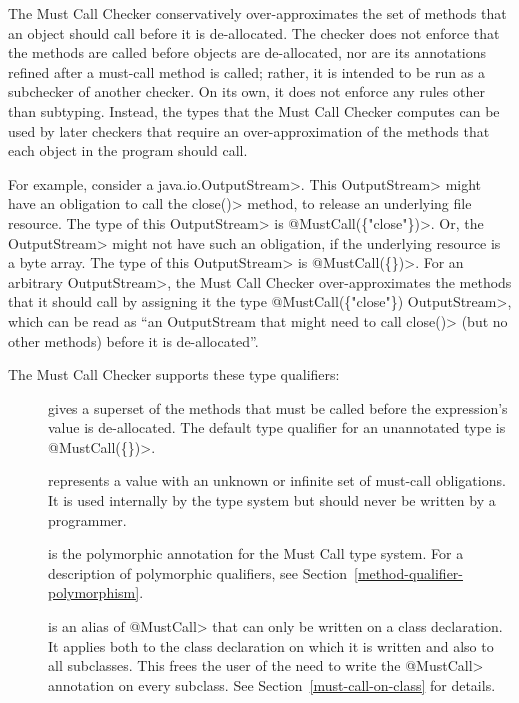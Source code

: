 \htmlhr
{}

The Must Call Checker conservatively over-approximates
the set of methods that an object should call before it is de-allocated.
The checker does not enforce that the methods are called before objects are de-allocated,
nor are its annotations refined after a must-call method is called; rather,
it is intended to be run as a subchecker of another checker. On its own, it does not
enforce any rules other than subtyping. Instead, the types that the Must Call Checker
computes can be used by later checkers that require an over-approximation
of the methods that each object in the program should call.

For example, consider a \<java.io.OutputStream>.  This \<OutputStream>
might have an obligation to call the \<close()> method, to release an
underlying file resource. The type of this \<OutputStream> is
\<@MustCall(\{"close"\})>.  Or, the \<OutputStream> might not have such an
obligation, if the underlying resource is a byte array. The type of this
\<OutputStream> is \<@MustCall(\{\})>.  For an arbitrary \<OutputStream>,
the Must Call Checker over-approximates the methods that it should call
by assigning it the type \<@MustCall(\{"close"\}) OutputStream>, which can
be read as ``an OutputStream that might need to call \<close()> (but no
other methods) before it is de-allocated''.


The Must Call Checker supports these type qualifiers:

\begin{description}

\item[]
  gives a superset of the methods that
  must be called before the expression's value is de-allocated.
  The default type qualifier for an unannotated type is \<@MustCall(\{\})>.

\item[]
  represents a value with an unknown or infinite set of must-call obligations.
  It is used internally by the type system but should never be written by a
  programmer.

\item[]
  is the polymorphic annotation for the Must Call type system.
  For a description of polymorphic qualifiers, see
  Section~\ref{method-qualifier-polymorphism}.

\item[]
  is an alias of \<@MustCall> that can only be written on a class declaration.
  It applies both to the class declaration on which it is written and also to all subclasses.
  This frees the user of the need to write the \<@MustCall> annotation on every subclass.
  See Section~\ref{must-call-on-class} for details.

\end{description}

